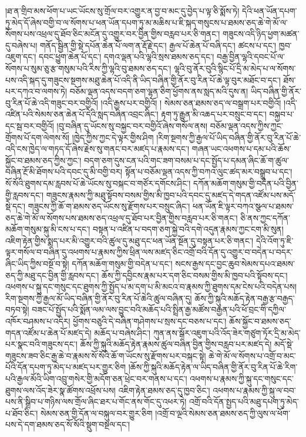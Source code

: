 །ཐ་ན་གྲིབ་མས་ཕོག་པ་ཡང་ཡོངས་སུ་གྲོལ་བར་འགྱུར་ན་བྱ་བ་མང་དུ་བྱེད་པ་ལྟ་ཅི་སྨོས་ཏེ། དེའི་ཕན་ཡོན་དཔག་ཏུ་མེད་དོ་ཞེས་བགྱི་བ་ལ་སོགས་པ་ཕན་ཡོན་དཔག་ཏུ་མ་མཆིས་པ་ཇི་སྐད་གསུངས་པ་ཐམས་ཅད་ཆེ་གེ་མོ་ལ་སོགས་པས་འཕྲལ་དུ་ཐོབ་ཅིང་མངོན་དུ་འགྱུར་བར་བྱིན་གྱིས་བརླབ་པར་ཅི་གནང་། གཟུངས་འདི་ཉིད་ཕྱག་མཚན་དུ་བཞེས་པ། གནོད་སྦྱིན་གྱི་སྡེ་དཔོན་ཆེན་པོ་ལག་ན་རྡོ་རྗེ་དང་། རྒྱལ་པོ་ཆེན་པོ་བཞི་དང་། ཚངས་པ་དང་། ཁྱབ་འཇུག་དང་། དབང་ཕྱུག་ཆེན་པོ་དང་། དགའ་ལྡན་པའི་ལྷའི་སྲས་ཐམས་ཅད་དང་། བརྒྱ་བྱིན་ལྷའི་དབང་པོ་ལ་སོགས་པ་སུམ་ཅུ་རྩ་གསུམ་པའི་རིས་ཀྱི་ལྷའི་བུ་ཐམས་ཅད་དང་། ལྷའི་བུ་ནོར་བུའི་སྙིང་པོ་དྲི་མ་མེད་པ་ལ་སོགས་པས་འདི་སྐད་དུ་གཟུངས་སྔགས་མཐུ་ཆེན་པོ་འདི་ནི་ཡིད་བཞིན་གྱི་ནོར་བུ་རིན་པོ་ཆེ་ལྟ་བུར་མཐོང་བ་དང་། ཐོས་པར་དཀའ་བ་ལགས་ཏེ། བཅོམ་ལྡན་འདས་བདག་ཅག་ལྷན་ཅིག་ཕྱོགས་ནས་སླད་མའི་དུས་ན། ཡིད་བཞིན་གྱི་ནོར་བུ་རིན་པོ་ཆེ་འདི་གཟུང་བར་བགྱིའོ། །འདི་རྒྱས་པར་བགྱིའོ། །
སེམས་ཅན་ཐམས་ཅད་ལ་བསྒྲག་པར་བགྱིའོ། །འདི་འཛིན་པའི་སེམས་ཅན་ཆེན་པོ་དེའི་སླད་བཞིན་འབྲང་ཞིང་། རྟག་ཏུ་རྒྱུན་མི་འཆད་པར་བསྲུང་བ་དང་། བསྐྱབ་པ་དང་སྦ་བར་བགྱིའོ། །བུ་བཞིན་དུ་ཡོངས་སུ་བསྐྱང་བར་བགྱིའོ་ཞེས་གསོལ་ནས། བཅོམ་ལྡན་འདས་ཀྱིས་ཀྱང་གྲོགས་པོ་དག་ལེགས་སོ། །ཁྱེད་ཀྱིས་ཀྱང་དེ་ལྟར་གྱིས་ཤིག །རིག་སྔགས་ཀྱི་རྒྱལ་པོ་ཡིད་བཞིན་གྱི་ནོར་བུ་རིན་པོ་ཆེ་འདི་ངས་ཁྱེད་ལ་གཏད་དོ་ཞེས་རྗེས་སུ་གནང་བར་མཛད་པ་རྣམས་དང་། གཞན་ཡང་འཕགས་པ་དམ་པའི་ཆོས་སྐྱོང་བ་ཐམས་ཅད་ཀྱིས་ཀྱང་། བདག་ཅག་དུས་ངན་པའི་གང་ཟག་བསམ་པ་དང་སྤྱོད་པ་དམན་ཞིང་ཆོ་ག་ཚུལ་བཞིན་རྔོ་མི་ཐོགས་པའི་དབང་དུ་མི་བགྱི་བར། སྟོན་པ་བཅོམ་ལྡན་འདས་ཀྱི་བཀའ་ལུང་ཚད་མར་བསྒྲུབ་པ་དང་། སོ་སོའི་ཐུགས་དམ་རླབས་པོ་ཆེ་ཡོངས་སུ་བསྐང་བ་གཙོར་དགོངས་ཤིང་། དཀོན་མཆོག་གསུམ་གྱི་བདེན་པའི་བྱིན་གྱི་རླབས་དང་། གཟུངས་རྣམས་ཀྱི་མཐུ་སྟོབས་བསམ་གྱིས་མི་ཁྱབ་པའི་དབང་དུ་མཛད་དེ་གདན་འཛོམ་པས་མདོ་སྡེ་དང་། གཟུངས་ཀྱི་ཆོ་ག་ཐམས་ཅད་ཡོངས་སུ་རྫོགས་པར་བསྲུང་ཞིང་། ཕན་ཡོན་ཇི་ལྟར་བཀའ་སྩལ་པ་ཐམས་ཅད་ཆེ་གེ་མོ་ལ་སོགས་པས་ཐམས་ཅད་འཕྲལ་དུ་ཐོབ་པར་བྱིན་གྱིས་བརླབ་པར་ཅི་གནང་། ཅི་ནས་ཀྱང་དཀོན་མཆོག་གསུམ་སྐུ་མི་ངས་པ་དང་། བསྟན་པ་འཛིན་པ་བདག་ཅག་སྐྱེ་བའི་དགེ་འདུན་རྣམས་ཀྱང་ངག་མི་སུན། འཇིག་རྟེན་གྱིས་སྨད་པར་མི་འགྱུར་བའི་ཚུལ་དུ་མཐུ་དང་ཕན་ཡོན་སྔོན་དུ་བསྟན་པར་ཅི་གནང་། དེའི་འོག་ཏུ་ཇི་ལྟར་གསོལ་བ་བཞིན་དུ་འཕགས་པ་རྣམས་ཀྱིས་ཕྲིན་ལས་མཛད་ཅིང་འགྲོ་བའི་དོན་དུ་འགྱུར་བ་བདེན་པ་བདར་ཞིང་ཡིད་ཀྱིས་བསྔོ་བ་སྟེ། དཀོན་མཆོག་གསུམ་གྱི་བདེན་པ་དང་། སངས་རྒྱས་དང་བྱང་ཆུབ་སེམས་དཔའ་ཐམས་ཅད་ཀྱི་མཐུ་དང་བྱིན་གྱི་རླབས་དང་། ཆོས་ཀྱི་དབྱིངས་རྣམ་པར་དག་ཅིང་བསམ་གྱིས་མི་ཁྱབ་པའི་སྟོབས་དང་། འཕགས་པ་སྐུ་དང་གསུང་དང་ཐུགས་ཀྱི་སྤྱོད་པ་མ་དག་པ་མི་མངའ་བ་རྣམས་ཀྱི་ཐུགས་དམ་ངེས་པའི་བདེན་པས། རིག་སྔགས་ཀྱི་རྒྱལ་མོ་ཡིད་བཞིན་གྱི་ནོར་བུ་རིན་པོ་ཆེའི་ཚུལ་བཞིན་དུ། ཆོས་ཀྱི་སྐུའི་མཆོད་རྟེན་བརྒྱ་རྩ་བརྒྱད་བཏབ་སྟེ། བཟང་པོ་སྤྱོད་པའི་སྨོན་ལམ་ལས་བྱུང་བའི་མཆོད་པའི་སྤྲིན་རྒྱ་མཚོས་བརྒྱན་པའི་ཕོ་བྲང་གི་དཀྱིལ་འཁོར་བཤམས་པ་འདིར། ཕྱོགས་བཅུའི་དེ་བཞིན་གཤེགས་པ་སྲས་དང་བཅས་པ་དང་། ཆོས་སྐྱོང་བ་ཐམས་ཅད་གདན་འཛོམ་པ་ཆེན་པོ་མཛད་དེ། མཆོད་པ་བཞེས་ཤིང་། ཀུན་ནས་སྒོར་འཇུག་པའི་འོད་ཟེར་གཙུག་ཏོར་དྲི་མ་མེད་པར་སྣང་བའི་གཟུངས་དང་། ཆོས་ཀྱི་སྐུའི་མཆོད་རྟེན་རྣམས་ཚུལ་བཞིན་བྱིན་གྱིས་བརླབ་པར་མཛད་དེ། མདོ་སྡེ་གཟུངས་ཟབ་ཅིང་རྒྱ་ཆེ་བ་རྣམས་སོ་སོའི་ཆོ་ག་ཡོངས་སུ་རྫོགས་པར་བསྐང་སྟེ། ཆེ་གེ་མོ་ལ་སོགས་པ་འགྲོ་བ་མང་པོའི་དོན་དཔག་ཏུ་མེད་པ་མཛད་པར་གྱུར་ཅིག །ཆོས་ཀྱི་སྐུའི་མཆོད་རྟེན་ལ་ཡིད་བཞིན་གྱི་ནོར་བུ་རིན་པོ་ཆེ་རིག་པའི་རྒྱལ་མོའི་ཡིག་འབྲུ་གསེར་གྱི་མདོག་ཅན་ཕྲེང་བར་གནས་པ་དང་། འཕགས་པ་རྣམས་ཀྱི་སྐུ་དང་གསུང་དང་ཐུགས་ལས་འོད་ཟེར་སྣ་ཚོགས་འཕྲོས་པས། འཇིག་རྟེན་ཐམས་ཅད་དུ་ཁྱབ་ཅིང་། འཕགས་པ་རྣམས་ཀྱི་སྐུ་ལ་བབ་པས་ནི་སྒྲིབ་པ་གཉིས་ལས་གྲོལ་ཞིང་ཐར་པ་གོང་ནས་གོང་དུ་འཕར་ཏེ། འགྲོ་བའི་དོན་སྤྱད་པའི་མཐུ་དཔག་ཏུ་མེད་པ་ཐོབ་ཅིང་། སེམས་ཅན་གྱི་དོན་ལ་བསྐུལ་བར་གྱུར་ཅིག །འགྲོ་བ་ལྔའི་སེམས་ཅན་ཐམས་ཅད་ཀྱི་ལུས་ལ་ཕོག་པས་དེ་དག་ཐམས་ཅད་སོ་སོའི་སྡུག་བསྔལ་དང་། 